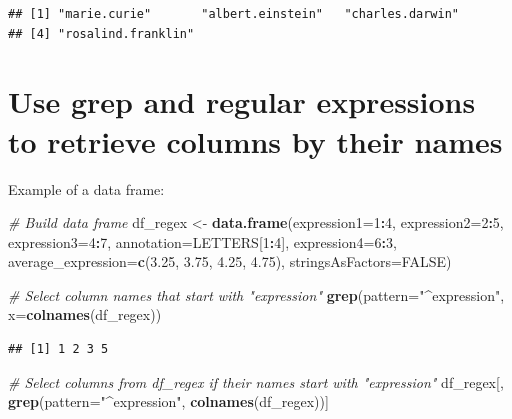 \documentclass[]{book}
\newenvironment{Shaded}{\begin{snugshade}}{\end{snugshade}}
\newcommand{\CommentTok}[1]{\textcolor[rgb]{0.56,0.35,0.01}{\textit{#1}}}
\newcommand{\DataTypeTok}[1]{\textcolor[rgb]{0.13,0.29,0.53}{#1}}
\newcommand{\DecValTok}[1]{\textcolor[rgb]{0.00,0.00,0.81}{#1}}
\newcommand{\FloatTok}[1]{\textcolor[rgb]{0.00,0.00,0.81}{#1}}
\newcommand{\KeywordTok}[1]{\textcolor[rgb]{0.13,0.29,0.53}{\textbf{#1}}}
\newcommand{\NormalTok}[1]{#1}
\newcommand{\OperatorTok}[1]{\textcolor[rgb]{0.81,0.36,0.00}{\textbf{#1}}}
\newcommand{\OtherTok}[1]{\textcolor[rgb]{0.56,0.35,0.01}{#1}}
\newcommand{\StringTok}[1]{\textcolor[rgb]{0.31,0.60,0.02}{#1}}
\begin{document}
\begin{verbatim}
## [1] "marie.curie"       "albert.einstein"   "charles.darwin"   
## [4] "rosalind.franklin"
\end{verbatim}

\hypertarget{use-grep-and-regular-expressions-to-retrieve-columns-by-their-names}{%
\section{Use grep and regular expressions to retrieve columns by their names}\label{use-grep-and-regular-expressions-to-retrieve-columns-by-their-names}}

Example of a data frame:

\begin{Shaded}
\begin{Highlighting}[]
\CommentTok{# Build data frame}
\NormalTok{df_regex <-}\StringTok{ }\KeywordTok{data.frame}\NormalTok{(}\DataTypeTok{expression1=}\DecValTok{1}\OperatorTok{:}\DecValTok{4}\NormalTok{, }
    \DataTypeTok{expression2=}\DecValTok{2}\OperatorTok{:}\DecValTok{5}\NormalTok{, }
    \DataTypeTok{expression3=}\DecValTok{4}\OperatorTok{:}\DecValTok{7}\NormalTok{, }
    \DataTypeTok{annotation=}\NormalTok{LETTERS[}\DecValTok{1}\OperatorTok{:}\DecValTok{4}\NormalTok{], }
    \DataTypeTok{expression4=}\DecValTok{6}\OperatorTok{:}\DecValTok{3}\NormalTok{, }
    \DataTypeTok{average_expression=}\KeywordTok{c}\NormalTok{(}\FloatTok{3.25}\NormalTok{, }\FloatTok{3.75}\NormalTok{, }\FloatTok{4.25}\NormalTok{, }\FloatTok{4.75}\NormalTok{),}
    \DataTypeTok{stringsAsFactors=}\OtherTok{FALSE}\NormalTok{)}

\CommentTok{# Select column names that start with "expression"}
\KeywordTok{grep}\NormalTok{(}\DataTypeTok{pattern=}\StringTok{"^expression"}\NormalTok{, }
    \DataTypeTok{x=}\KeywordTok{colnames}\NormalTok{(df_regex))}
\end{Highlighting}
\end{Shaded}

\begin{verbatim}
## [1] 1 2 3 5
\end{verbatim}

\begin{Shaded}
\begin{Highlighting}[]
\CommentTok{# Select columns from df_regex if their names start with "expression"}
\NormalTok{df_regex[, }\KeywordTok{grep}\NormalTok{(}\DataTypeTok{pattern=}\StringTok{"^expression"}\NormalTok{, }\KeywordTok{colnames}\NormalTok{(df_regex))]}
\end{Highlighting}
\end{Shaded}
\end{document}
